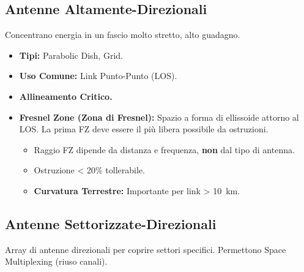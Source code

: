 \documentclass{article}
\begin{document}
\subsection{Antenne Altamente-Direzionali}
Concentrano energia in un fascio molto stretto, alto guadagno.
\begin{itemize}
    \item \textbf{Tipi:} Parabolic Dish, Grid.
    \item \textbf{Uso Comune:} Link Punto-Punto (LOS).
    \item \textbf{Allineamento Critico.}
    \item \textbf{Fresnel Zone (Zona di Fresnel):} Spazio a forma di ellissoide attorno al LOS. La prima FZ deve essere il più libera possibile da ostruzioni.
    \begin{itemize}
        \item Raggio FZ dipende da distanza e frequenza, \textbf{non} dal tipo di antenna.
        \item Ostruzione < 20\% tollerabile.
        \item \textbf{Curvatura Terrestre:} Importante per link > \SI{10}{\kilo\meter}.
    \end{itemize}
\end{itemize}
\begin{center}
\end{center}

\subsection{Antenne Settorizzate-Direzionali}
Array di antenne direzionali per coprire settori specifici. Permettono Space Multiplexing (riuso canali).
\end{document}

